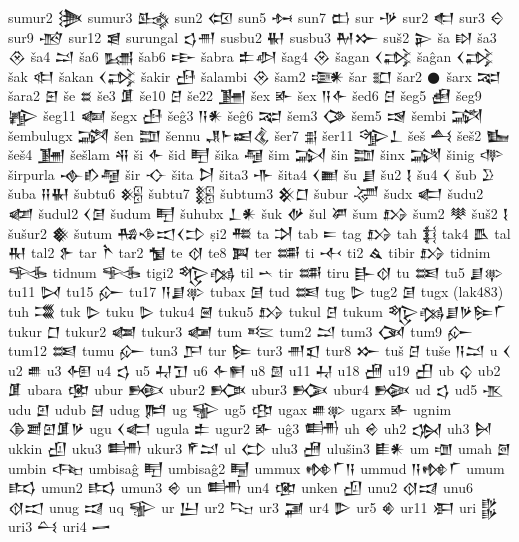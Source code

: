  sumur2  𒋦   
 sumur3  𒈰   
 sun2  𒄢   
 sun5  𒁔   
 sun7  𒆗   
 sur  𒋩   
 sur2  𒊨   
 sur3  𒄮   
 sur9  𒋪   
 sur12  𒇭   
 surungal  𒌓𒉣    
 susbu2  𒈽   
 susbu3  𒈹𒁍    
 suš2  𒉌   
 ša  𒊭   
 ša3  𒊮   
 ša4  𒁺   
 ša6  𒊷   
 šab6  𒊸   
 šabra  𒉺𒀠    
 šag4  𒊮   
 šagan  𒌋𒃶    
 šaĝan  𒌋𒃶    
 šak  𒊕   
 šakan  𒌋𒃶    
 šakir  𒍀   
 šalambi  𒊮   
 šam2  𒉛   
 šar  𒊬   
 šar2  𒊹   
 šarx  𒉈   
 šara2  𒇋   
 še  𒊺   
 še3  𒂠   
 še10  𒆪   
 še22  𒂞   
 šex  𒅊   
 šex  𒀀𒅆    
 šed6  𒆪   
 šeg5  𒍋   
 šeg9  𒊾   
 šeg11  𒅝   
 šegx  𒍀   
 šeĝ3  𒀀𒀭    
 šeĝ6  𒉈   
 šem3  𒀚   
 šem5  𒀎   
 šembi  𒋍   
 šembulugx  𒋎   
 šen  𒊿   
 šennu  𒂗𒈨𒀜𒆬    
 šer7  𒉪   
 šer11  𒄊𒁇    
 šeš  𒋀   
 šeš2  𒋁   
 šeš4  𒂞   
 šešlam  𒋂   
 ši  𒅆   
 šid  𒋃   
 šika  𒆷   
 šim  𒋆   
 šin  𒊿   
 šinx  𒋋   
 šinig  𒋒   
 širpurla   𒉢𒁓𒆷   
 šir  𒋓   
 šita  𒋖   
 šita3  𒋥   
 šita4  𒌋𒆤    
 šu  𒋗   
 šu2  𒋙   
 šu4  𒌋   
 šub  𒊒   
 šuba  𒍝𒈽    
 šubtu6  𒆝   
 šubtu7  𒆞   
 šubtum3  𒆜𒆸    
 šubur  𒋚   
 šudx  𒅗   
 šudu2  𒆃   
 šudul2  𒌋𒌆    
 šudum  𒋃   
 šuhubx  𒁇𒀭    
 šuk  𒉻   
 šul  𒂄   
 šum  𒋳   
 šum2  𒋧   
 šuš2  𒋙   
 šušur2  𒀽   
 šutum  𒄀𒈾𒀊𒌋𒄞    
 ṣi2  𒍣   
 ta  𒋫   
 tab  𒋰   
 tag  𒋳   
 tah  𒈭   
 tak4  𒋺   
 tal  𒊑   
 tal2  𒉿   
 tar  𒋻   
 tar2  𒁯   
 te  𒋼   
 te8  𒀉   
 ter  𒌁   
 ti  𒋾   
 ti2  𒎗   
 tibir  𒋳   
 tidnim  𒊎   
 tidnum  𒊎   
 tigi2  𒈜𒁆    
 til  𒌀   
 tir  𒌁   
 tiru  𒃲𒋼    
 tu  𒌅   
 tu5  𒋗𒉀    
 tu11  𒄸   
 tu15  𒅎   
 tu17  𒀀𒋗𒉀    
 tubax  𒌆   
 tud  𒌅   
 tug  𒌇   
 tug2  𒌆   
 tugx  (lak483)   
 tuh  𒂃   
 tuk  𒌇   
 tuku  𒌇   
 tuku4  𒇧   
 tuku5  𒋳   
 tukul  𒆪   
 tukum  𒈜𒁆𒋗𒃻𒌉𒇲    
 tukur  𒆸   
 tukur2  𒆁   
 tukur3  𒆈   
 tum  𒌈   
 tum2  𒁺   
 tum3  𒉐   
 tum9  𒅎   
 tum12  𒌅   
 tumu  𒅎   
 tun3  𒂅   
 tur  𒌉   
 tur3  𒉣𒇬    
 tur8  𒁍   
 tuš  𒆪   
 tuše  𒀀𒁺    
 u  𒌋   
 u2  𒌑   
 u3  𒅇   
 u4  𒌓   
 u5  𒄷𒋛    
 u6  𒅆𒂍    
 u8  𒇇   
 u11  𒄷   
 u18  𒍇   
 u19  𒌷   
 ub  𒌒   
 ub2  𒂠   
 ubara  𒂬   
 ubur  𒁛   
 ubur2  𒁥   
 ubur3  𒁡   
 ubur4  𒁢   
 ud  𒌓   
 ud5  𒍚   
 udu  𒇻   
 udub  𒇛   
 udug  𒌜   
 ug  𒊌   
 ug5  𒂦   
 ugax  𒌑𒉀    
 ugarx  𒅊   
 ugnim  𒆠𒋢𒇻𒂠𒃻    
 ugu  𒌋𒅗    
 ugula  𒉺   
 ugur2  𒅊   
 uĝ3  𒌦   
 uh  𒄴   
 uh2  𒌔   
 uh3  𒆵   
 ukkin  𒌺   
 uku3  𒌦   
 ukur3  𒇳𒁺    
 ul  𒌌   
 ulu3  𒍇   
 ulušin3  𒀾𒀭    
 um  𒌝   
 umah  𒇦   
 umbin  𒌢   
 umbisaĝ  𒋃   
 umbisaĝ2  𒋄   
 ummux  𒂔𒇲𒀀    
 ummud  𒀀𒂔𒇲    
 umum  𒌣   
 umun2  𒌣   
 umun3  𒄴   
 un  𒌦   
 un4  𒂬   
 unken  𒌺   
 unu2  𒋼𒀕    
 unu6  𒋼𒀊    
 unug  𒀕   
 uq  𒊌   
 ur  𒌨   
 ur2  𒌫   
 ur3  𒃡   
 ur4  𒌴   
 ur5  𒄯   
 ur11  𒀳   
 uri  𒌵   
 uri3  𒌶   
 uri4  𒅂   
